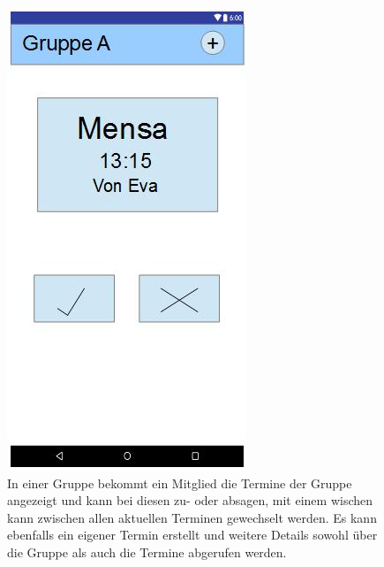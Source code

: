 \documentclass{scrartcl}
\begin{document}
	\newpage
	\begin{figure}[h]
	\centering
	\includegraphics[width=.5\textwidth]{GUI_Gruppe.jpg}
	\caption{In einer Gruppe bekommt ein  Mitglied die Termine der Gruppe angezeigt und kann bei diesen zu- oder absagen, mit einem wischen kann zwischen allen aktuellen Terminen gewechselt werden. Es kann ebenfalls ein eigener Termin erstellt und weitere Details sowohl über die Gruppe als auch die Termine abgerufen werden.}
 	\end{figure}
\end{document}
